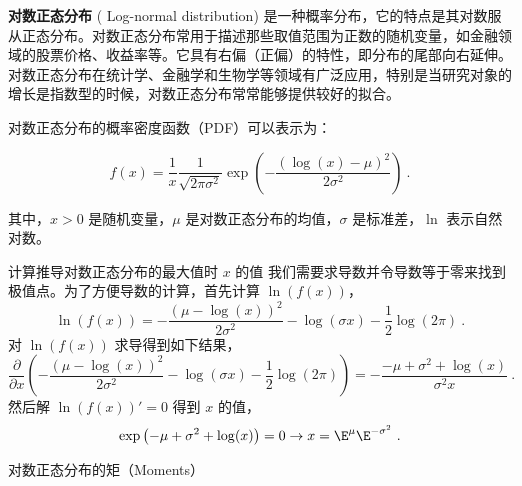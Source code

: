 
\textbf{对数正态分布} (
Log-normal distribution) 是一种概率分布，它的特点是其对数服从正态分布。对数正态分布常用于描述那些取值范围为正数的随机变量，如金融领域的股票价格、收益率等。它具有右偏（正偏）的特性，即分布的尾部向右延伸。对数正态分布在统计学、金融学和生物学等领域有广泛应用，特别是当研究对象的增长是指数型的时候，对数正态分布常常能够提供较好的拟合。

对数正态分布的概率密度函数（PDF）可以表示为：

\begin{equation}
f(x) = \frac{1}{x} \frac{1}{\sqrt{2 \pi \sigma^2}} \exp \left(-\frac{(\log (x)-\mu)^2}{2 \sigma^2}\right)~.
\end{equation}

其中，\( x > 0 \) 是随机变量，\( \mu \) 是对数正态分布的均值，\( \sigma \) 是标准差，\( \ln \) 表示自然对数。

\begin{example}{计算推导对数正态分布的最大值时 \( x \) 的值}
我们需要求导数并令导数等于零来找到极值点。为了方便导数的计算，首先计算 $\ln(f(x))$，
\begin{equation}
    \ln(f(x)) = -\frac{(\mu-\log (x))^2}{2 \sigma^2}-\log (\sigma x)-\frac{1}{2} \log (2 \pi)~.
\end{equation}
对 $\ln(f(x))$ 求导得到如下结果，
\begin{equation}
\frac{\partial}{\partial x}\left(-\frac{(\mu-\log (x))^2}{2 \sigma^2}-\log (\sigma x)-\frac{1}{2} \log (2 \pi)\right) = -\frac{-\mu+\sigma^2+\log (x)}{\sigma^2 x}~.
\end{equation}
然后解 $\ln(f(x))'=0$ 得到 $x$ 的值，
\begin{equation}
    \exp \left({-\mu+\sigma^2+\log (x)}\right) = 0 \rightarrow x = \E^{\mu}\E^{-\sigma^2}~.
\end{equation}
\end{example}
\begin{example}{对数正态分布的矩（Moments）}

\end{example}